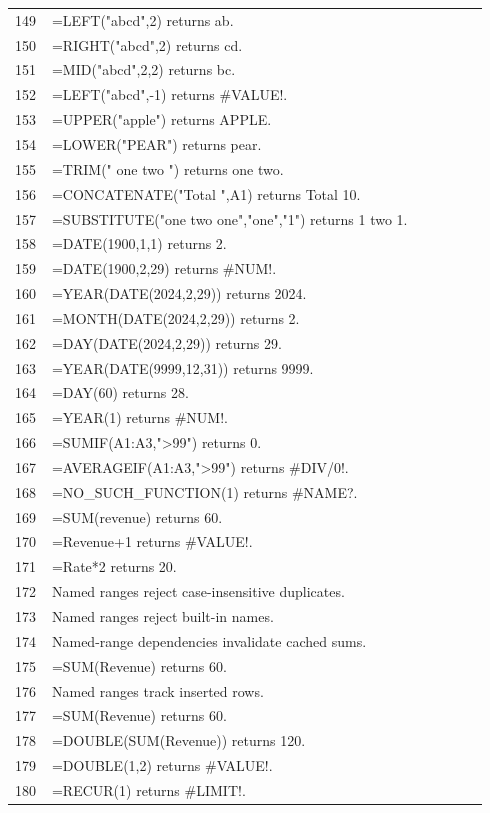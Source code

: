 \documentclass[11pt,letterpaper]{article}
\begin{document}
\begin{longtable}{@{}P{0.07\linewidth}P{0.87\linewidth}@{}}
149 & =LEFT("abcd",2) returns ab.\\
150 & =RIGHT("abcd",2) returns cd.\\
151 & =MID("abcd",2,2) returns bc.\\
152 & =LEFT("abcd",-1) returns \#VALUE!.\\
153 & =UPPER("apple") returns APPLE.\\
154 & =LOWER("PEAR") returns pear.\\
155 & =TRIM("  one   two  ") returns one two.\\
156 & =CONCATENATE("Total ",A1) returns Total 10.\\
157 & =SUBSTITUTE("one two one","one","1") returns 1 two 1.\\
158 & =DATE(1900,1,1) returns 2.\\
159 & =DATE(1900,2,29) returns \#NUM!.\\
160 & =YEAR(DATE(2024,2,29)) returns 2024.\\
161 & =MONTH(DATE(2024,2,29)) returns 2.\\
162 & =DAY(DATE(2024,2,29)) returns 29.\\
163 & =YEAR(DATE(9999,12,31)) returns 9999.\\
164 & =DAY(60) returns 28.\\
165 & =YEAR(1) returns \#NUM!.\\
166 & =SUMIF(A1:A3,">99") returns 0.\\
167 & =AVERAGEIF(A1:A3,">99") returns \#DIV/0!.\\
168 & =NO\_SUCH\_FUNCTION(1) returns \#NAME?.\\
169 & =SUM(revenue) returns 60.\\
170 & =Revenue+1 returns \#VALUE!.\\
171 & =Rate*2 returns 20.\\
172 & Named ranges reject case-insensitive duplicates.\\
173 & Named ranges reject built-in names.\\
174 & Named-range dependencies invalidate cached sums.\\
175 & =SUM(Revenue) returns 60.\\
176 & Named ranges track inserted rows.\\
177 & =SUM(Revenue) returns 60.\\
178 & =DOUBLE(SUM(Revenue)) returns 120.\\
179 & =DOUBLE(1,2) returns \#VALUE!.\\
180 & =RECUR(1) returns \#LIMIT!.\\

\end{longtable}
\end{document}
